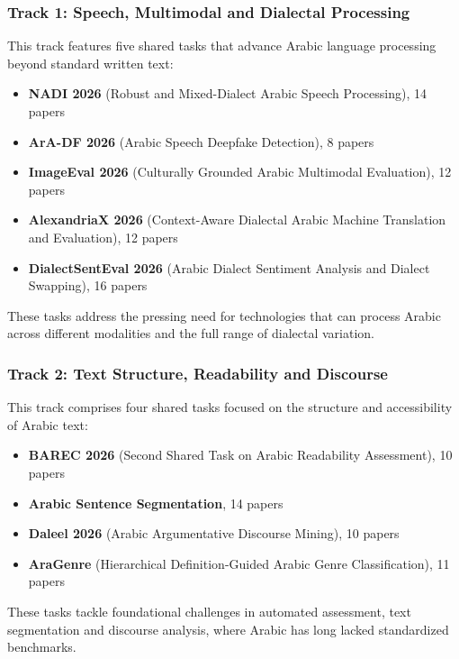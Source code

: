 \subsubsection*{\textbf{Track 1: Speech, Multimodal and Dialectal Processing}}

This track features five shared tasks that advance Arabic language processing beyond standard written text:

\begin{itemize}
\item \textbf{NADI 2026} (Robust and Mixed-Dialect Arabic Speech Processing), 14 papers  
\item \textbf{ArA-DF 2026} (Arabic Speech Deepfake Detection), 8 papers  
\item \textbf{ImageEval 2026} (Culturally Grounded Arabic Multimodal Evaluation), 12 papers  
\item \textbf{AlexandriaX 2026} (Context-Aware Dialectal Arabic Machine Translation and Evaluation), 12 papers  
\item \textbf{DialectSentEval 2026} (Arabic Dialect Sentiment Analysis and Dialect Swapping), 16 papers
\end{itemize}

These tasks address the pressing need for technologies that can process Arabic across different modalities and the full range of dialectal variation.

\subsubsection*{\textbf{Track 2: Text Structure, Readability and Discourse}}

This track comprises four shared tasks focused on the structure and accessibility of Arabic text:

\begin{itemize}
\item \textbf{BAREC 2026} (Second Shared Task on Arabic Readability Assessment), 10 papers  
\item \textbf{Arabic Sentence Segmentation}, 14 papers  
\item \textbf{Daleel 2026} (Arabic Argumentative Discourse Mining), 10 papers  
\item \textbf{AraGenre} (Hierarchical Definition-Guided Arabic Genre Classification), 11 papers
\end{itemize}

These tasks tackle foundational challenges in automated assessment, text segmentation and discourse analysis, where Arabic has long lacked standardized benchmarks.

